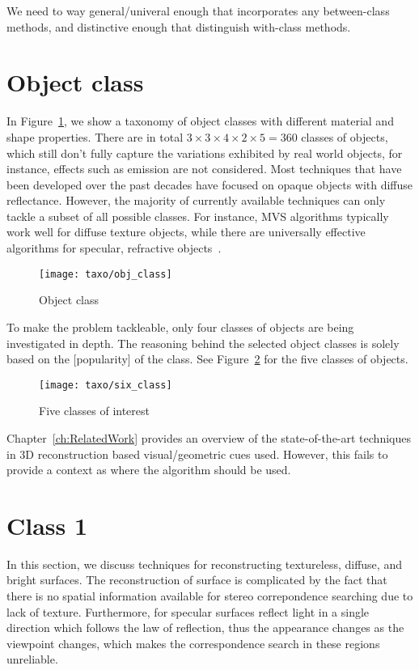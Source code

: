 We need to way general/univeral enough that incorporates any between-class methods, and distinctive enough that distinguish with-class methods.

\section{Object class}
In Figure~\ref{fig:obj_class}, we show a taxonomy of object classes with different material and shape properties. There are in total $3\times 3\times 4\times 2\times 5 = 360$ classes of objects, which still don't fully capture the variations exhibited by real world objects, for instance, effects such as emission are not considered. Most techniques that have been developed over the past decades have focused on opaque objects with diffuse reflectance. However, the majority of currently available techniques can only tackle a subset of all possible classes. For instance, MVS algorithms typically work well for diffuse texture objects, while there are universally effective algorithms for specular, refractive objects~\cite{ihrke2010transparent}.
\begin{figure}[h]
\centering
\texttt{[image: taxo/obj\_class]}
\caption{Object class}
\label{fig:obj_class}
\end{figure}

To make the problem tackleable, only four classes of objects are being investigated in depth. The reasoning behind the selected object classes is solely based on the [popularity] of the class. See Figure~\ref{fig:class_of_interest} for the five classes of objects.

\begin{figure}[ht]
\centering
\texttt{[image: taxo/six\_class]}
\caption{Five classes of interest}
\label{fig:class_of_interest}
\end{figure}

Chapter~\ref{ch:RelatedWork} provides an overview of the state-of-the-art techniques in 3D reconstruction based visual/geometric cues used. However, this fails to provide a context as where the algorithm should be used.

\section{Class 1}
In this section, we discuss techniques for reconstructing textureless, diffuse, and bright surfaces. The reconstruction of surface is complicated by the fact that there is no spatial information available for stereo correpondence searching due to lack of texture. Furthermore, for specular surfaces reflect light in a single direction which follows the law of reflection, thus the appearance changes as the viewpoint changes, which makes the correspondence search in these regions unreliable.

